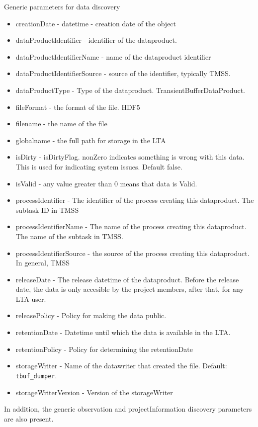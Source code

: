 \documentclass[a4paper,10pt,bibtotoc]{scrartcl}
\begin{document}
Generic parameters for data discovery
\begin{itemize}
    \item creationDate - datetime - creation date of the object
    \item dataProductIdentifier - identifier of the dataproduct.
    \item dataProductIdentifierName - name of the dataproduct identifier
    \item dataProductIdentifierSource - source of the identifier, typically TMSS. 
    \item dataProductType - Type of the dataproduct. TransientBufferDataProduct.
    \item fileFormat - the format of the file. HDF5
    \item filename - the name of the file
    \item globalname - the full path for storage in the LTA
    \item isDirty - isDirtyFlag. nonZero indicates something is wrong with this data. This is used for indicating system issues. Default false.
    \item isValid - any value greater than 0 means that data is Valid.
    \item processIdentifier - The identifier of the process creating this dataproduct. The subtask ID in TMSS
    \item processIdentifierName - The name of the process creating this dataproduct. The name of the subtask in TMSS.
    \item processIdentifierSource - the source of the process creating this dataproduct. In general, TMSS
    \item releaseDate - The release datetime of the dataproduct. Before the release date, the data is only accesible by the project members, after that, for any LTA user.
    \item releasePolicy - Policy for making the data public.
    \item retentionDate - Datetime until which the data is available in the LTA.
    \item retentionPolicy - Policy for determining the retentionDate
    \item storageWriter - Name of the datawriter that created the file. Default: \verb|tbuf_dumper|.
    \item storageWriterVersion - Version of the storageWriter
\end{itemize}

In addition, the generic observation and projectInformation discovery parameters are also present. 
\end{document}
